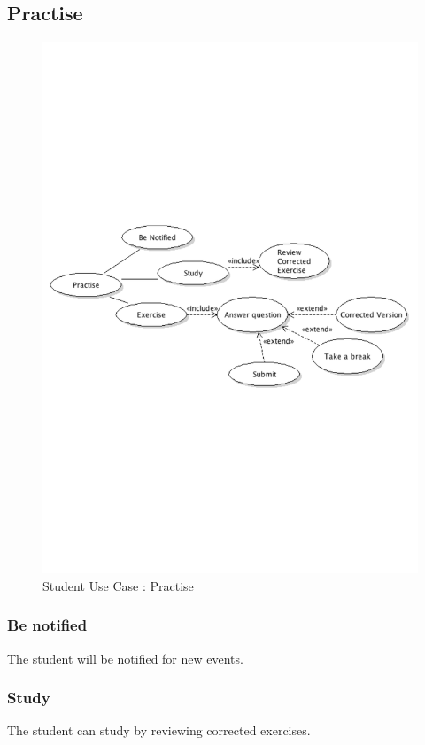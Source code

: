 	\subsection{Practise}
		\begin{figure}[ht]
			\begin{center}
				\includegraphics[width=\textwidth,  trim=2cm 10cm 2cm 10cm]{UML_figure/UC/student/UC_Student_Practise.pdf}
				\caption{Student Use Case : Practise}
			\end{center}
		\end{figure}
		\subsubsection{Be notified}
			The student will be notified for new events.
		\subsubsection{Study}
			The student can study by reviewing corrected exercises.
